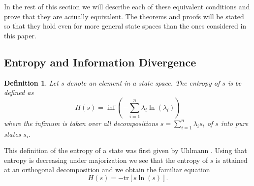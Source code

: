 \documentclass[10pt,a4paper,draft]{article}
\newtheorem{Definition}{Definition}
\begin{document}
In the rest of this section we will describe each of these
equivalent conditions and prove that they are actually
equivalent. The theorems and proofs
will be stated so that they hold even for more general state
spaces than the ones considered in this paper.


\subsection{Entropy and Information Divergence}

\begin{Definition}
Let $s$ denote an element in a state space. The \emph{entropy}
of $s$ is be defined as 
\[
H\left(s\right)=\inf\left(-\sum_{i=1}^{n}\lambda_{i}\ln\left(\lambda_{i}\right)\right)
\]
where the infimum is taken over all decompositions
$s=\sum_{i=1}^{n}\lambda_{i}s_{i}$ of $s$ into pure states
$s_i$.
\end{Definition}
 This definition of the entropy of a state was first given by
Uhlmann \cite{Uhlmann1970}. Using that entropy is decreasing under
majorization we see that the entropy of $s$
is attained at an orthogonal decomposition \cite{Harremoes2016d}
and we obtain the familiar equation
\[
H(s) = - \mathrm{tr}\left[s\ln(s)\right] .
\]
\end{document}
